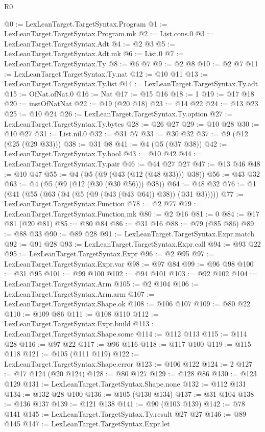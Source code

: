 \begin{lexlean}{R0}
\begin{coremodule}
@0 := LexLeanTarget.TargetSyntax.Program
@1 := LexLeanTarget.TargetSyntax.Program.mk
@2 := List.cons.{0}
@3 := LexLeanTarget.TargetSyntax.Adt
@4 := @2 @3
@5 := LexLeanTarget.TargetSyntax.Adt.mk
@6 := List.{0}
@7 := LexLeanTarget.TargetSyntax.Ty
@8 := @6 @7
@9 := @2 @8
@10 := @2 @7
@11 := LexLeanTarget.TargetSyntax.Ty.nat
@12 := @10 @11
@13 := LexLeanTarget.TargetSyntax.Ty.list
@14 := LexLeanTarget.TargetSyntax.Ty.adt
@15 := OfNat.ofNat.{0}
@16 := Nat
@17 := @15 @16
@18 := 1
@19 := @17 @18
@20 := instOfNatNat
@22 := @19 (@20 @18)
@23 := @14 @22
@24 := @13 @23
@25 := @10 @24
@26 := LexLeanTarget.TargetSyntax.Ty.option
@27 := LexLeanTarget.TargetSyntax.Ty.bytes
@28 := @26 @27
@29 := @10 @28
@30 := @10 @27
@31 := List.nil.{0}
@32 := @31 @7
@33 := @30 @32
@37 := @9 (@12 (@25 (@29 @33)))
@38 := @31 @8
@41 := @4 (@5 (@37 @38))
@42 := LexLeanTarget.TargetSyntax.Ty.bool
@43 := @10 @42
@44 := LexLeanTarget.TargetSyntax.Ty.pair
@46 := @44 @27 @27
@47 := @13 @46
@48 := @10 @47
@55 := @4 (@5 (@9 (@43 (@12 (@48 @33))) @38))
@56 := @43 @32
@63 := @4 (@5 (@9 (@12 (@30 (@30 @56))) @38))
@64 := @48 @32
@76 := @1 (@41 (@55 (@63 (@4 (@5 (@9 (@43 (@43 @64)) @38)) (@31 @3)))))
@77 := LexLeanTarget.TargetSyntax.Function
@78 := @2 @77
@79 := LexLeanTarget.TargetSyntax.Function.mk
@80 := @2 @16
@81 := 0
@84 := @17 @81 (@20 @81)
@85 := @80 @84
@86 := @31 @16
@88 := @79 (@85 @86)
@89 := @88 @33
@90 := @89 @28
@91 := LexLeanTarget.TargetSyntax.Expr.match
@92 := @91 @28
@93 := LexLeanTarget.TargetSyntax.Expr.call
@94 := @93 @22
@95 := LexLeanTarget.TargetSyntax.Expr
@96 := @2 @95
@97 := LexLeanTarget.TargetSyntax.Expr.var
@98 := @97 @84
@99 := @96 @98
@100 := @31 @95
@101 := @99 @100
@102 := @94 @101
@103 := @92 @102
@104 := LexLeanTarget.TargetSyntax.Arm
@105 := @2 @104
@106 := LexLeanTarget.TargetSyntax.Arm.arm
@107 := LexLeanTarget.TargetSyntax.Shape.ok
@108 := @106 @107
@109 := @80 @22
@110 := @109 @86
@111 := @108 @110
@112 := LexLeanTarget.TargetSyntax.Expr.build
@113 := LexLeanTarget.TargetSyntax.Shape.some
@114 := @112 @113
@115 := @114 @28
@116 := @97 @22
@117 := @96 @116
@118 := @117 @100
@119 := @115 @118
@121 := @105 (@111 @119)
@122 := LexLeanTarget.TargetSyntax.Shape.error
@123 := @106 @122
@124 := 2
@127 := @17 @124 (@20 @124)
@128 := @80 @127
@129 := @128 @86
@130 := @123 @129
@131 := LexLeanTarget.TargetSyntax.Shape.none
@132 := @112 @131
@134 := @132 @28 @100
@136 := @105 (@130 @134)
@137 := @31 @104
@138 := @136 @137
@139 := @121 @138
@141 := @90 (@103 @139)
@142 := @78 @141
@145 := LexLeanTarget.TargetSyntax.Ty.result @27 @27
@146 := @89 @145
@147 := LexLeanTarget.TargetSyntax.Expr.let

\end{coremodule}
\end{lexlean}
